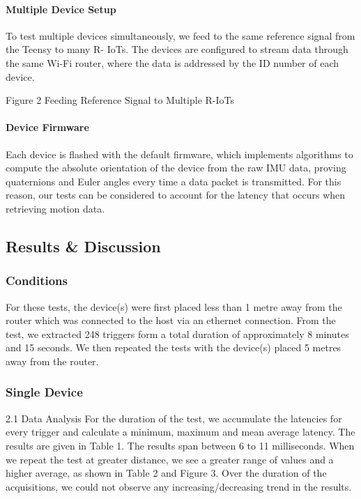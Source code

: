 \paragraph{Multiple Device Setup}
To test multiple devices simultaneously, we feed to the same reference signal from the Teensy to many R- IoTs. The devices are configured to stream data through the same Wi-Fi router, where the data is addressed by the ID number of each device.

Figure 2 Feeding Reference Signal to Multiple R-IoTs

\paragraph{Device Firmware}
Each device is flashed with the default firmware, which implements algorithms to compute the absolute orientation of the device from the raw IMU data, proving quaternions and Euler angles every time a data packet is transmitted. For this reason, our tests can be considered to account for the latency that occurs when retrieving motion data.

\subsection{Results \& Discussion}

\subsubsection{Conditions}
For these tests, the device(s) were first placed less than 1 metre away from the router which was connected to the host via an ethernet connection. From the test, we extracted 248 triggers form a total duration of approximately 8 minutes and 15 seconds. We then repeated the tests with the device(s) placed 5 metres away from the router.

\subsubsection{Single Device}

2.1 Data Analysis
For the duration of the test, we accumulate the latencies for every trigger and calculate a minimum, maximum and mean average latency. The results are given in Table 1. The results span between 6 to 11 milliseconds. When we repeat the test at greater distance, we see a greater range of values and a higher average, as shown in Table 2 and Figure 3. Over the duration of the acquisitions, we could not observe any increasing/decreasing trend in the results.

